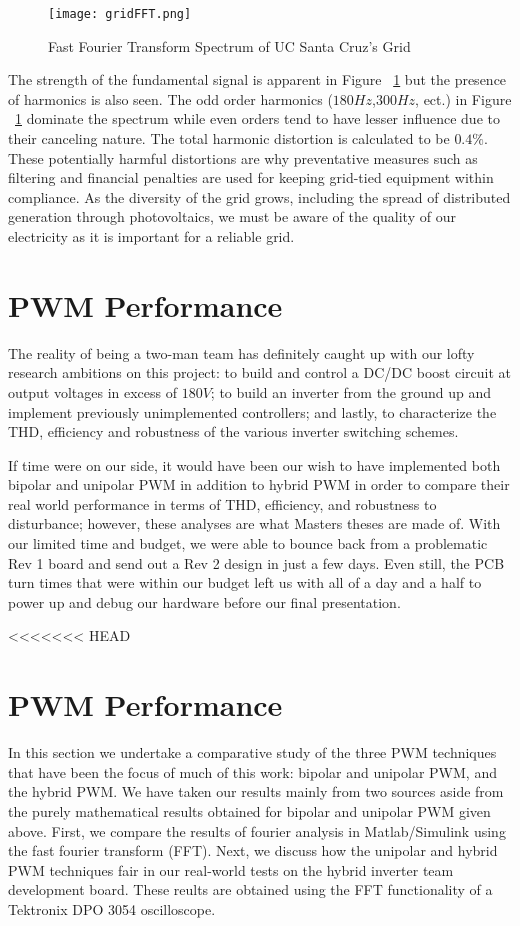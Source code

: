 \begin{figure}
\centering
\texttt{[image: gridFFT.png]}
\caption{Fast Fourier Transform Spectrum of UC Santa Cruz's Grid}
\label{gridFFT}
\end{figure}

The strength of the fundamental signal is apparent in Figure ~\ref{gridFFT} but the presence of harmonics is also seen. The odd order harmonics ($180 Hz$,$300 Hz$, ect.) in  Figure ~\ref{gridFFT} dominate the spectrum while even orders tend to have lesser influence due to their canceling nature. The total harmonic distortion is calculated to be $0.4\%$. These potentially harmful distortions are why preventative measures such as filtering and financial penalties are used for keeping grid-tied equipment within compliance. As the diversity of the grid grows, including the spread of distributed generation through photovoltaics, we must be aware of the quality of our electricity as it is important for a reliable grid.

\section{PWM Performance}
The reality of being a two-man team has definitely caught up with our lofty research ambitions on this project: to build and control a DC/DC boost circuit at output voltages in excess of $180V$; to build an inverter from the ground up and implement previously unimplemented controllers; and lastly, to characterize the THD, efficiency and robustness of the various inverter switching schemes.

If time were on our side, it would have been our wish to have implemented both bipolar and unipolar PWM in addition to hybrid PWM in order to compare their real world performance in terms of THD, efficiency, and robustness to disturbance; however, these analyses are what Masters theses are made of. With our limited time and budget, we were able to bounce back from a problematic Rev 1 board and send out a Rev 2 design in just a few days. Even still, the PCB turn times that were within our budget left us with all of a day and a half to power up and debug our hardware before our final presentation. 

<<<<<<< HEAD
\section{PWM Performance}
In this section we undertake a comparative study of the three PWM techniques that have been the focus of much of this work: bipolar and unipolar PWM, and the hybrid PWM. We have taken our results mainly from two sources aside from the purely mathematical results obtained for bipolar and unipolar PWM given above. First, we compare the results of fourier analysis in Matlab/Simulink using the fast fourier transform (FFT). Next, we discuss how the unipolar and hybrid PWM techniques fair in our real-world tests on the hybrid inverter team development board. These reults are obtained using the FFT functionality of a Tektronix DPO 3054 oscilloscope.

